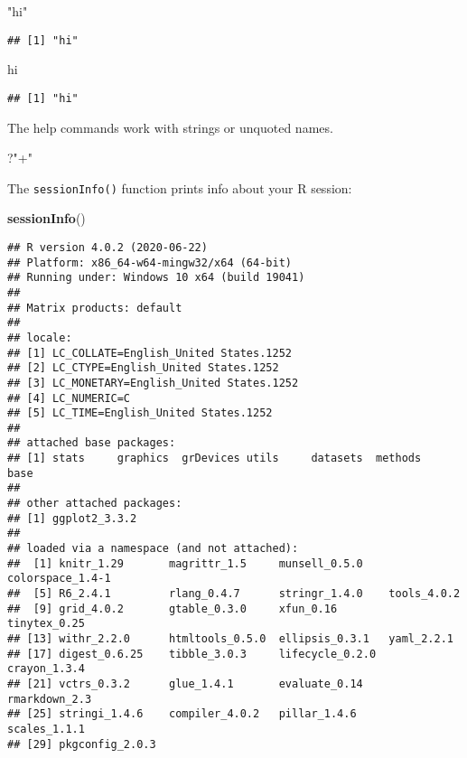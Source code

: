 \documentclass[
]{article}
\newenvironment{Shaded}{\begin{snugshade}}{\end{snugshade}}
\newcommand{\KeywordTok}[1]{\textcolor[rgb]{0.13,0.29,0.53}{\textbf{#1}}}
\newcommand{\NormalTok}[1]{#1}
\newcommand{\StringTok}[1]{\textcolor[rgb]{0.31,0.60,0.02}{#1}}
\begin{document}
\begin{Shaded}
\begin{Highlighting}[]
\StringTok{"hi"}
\end{Highlighting}
\end{Shaded}

\begin{verbatim}
## [1] "hi"
\end{verbatim}

\begin{Shaded}
\begin{Highlighting}[]
\StringTok{\textquotesingle{}hi\textquotesingle{}}
\end{Highlighting}
\end{Shaded}

\begin{verbatim}
## [1] "hi"
\end{verbatim}

The help commands work with strings or unquoted names.

\begin{Shaded}
\begin{Highlighting}[]
\NormalTok{?}\StringTok{"+"}
\end{Highlighting}
\end{Shaded}

The \texttt{sessionInfo()} function prints info about your R session:

\begin{Shaded}
\begin{Highlighting}[]
\KeywordTok{sessionInfo}\NormalTok{()}
\end{Highlighting}
\end{Shaded}

\begin{verbatim}
## R version 4.0.2 (2020-06-22)
## Platform: x86_64-w64-mingw32/x64 (64-bit)
## Running under: Windows 10 x64 (build 19041)
## 
## Matrix products: default
## 
## locale:
## [1] LC_COLLATE=English_United States.1252 
## [2] LC_CTYPE=English_United States.1252   
## [3] LC_MONETARY=English_United States.1252
## [4] LC_NUMERIC=C                          
## [5] LC_TIME=English_United States.1252    
## 
## attached base packages:
## [1] stats     graphics  grDevices utils     datasets  methods   base     
## 
## other attached packages:
## [1] ggplot2_3.3.2
## 
## loaded via a namespace (and not attached):
##  [1] knitr_1.29       magrittr_1.5     munsell_0.5.0    colorspace_1.4-1
##  [5] R6_2.4.1         rlang_0.4.7      stringr_1.4.0    tools_4.0.2     
##  [9] grid_4.0.2       gtable_0.3.0     xfun_0.16        tinytex_0.25    
## [13] withr_2.2.0      htmltools_0.5.0  ellipsis_0.3.1   yaml_2.2.1      
## [17] digest_0.6.25    tibble_3.0.3     lifecycle_0.2.0  crayon_1.3.4    
## [21] vctrs_0.3.2      glue_1.4.1       evaluate_0.14    rmarkdown_2.3   
## [25] stringi_1.4.6    compiler_4.0.2   pillar_1.4.6     scales_1.1.1    
## [29] pkgconfig_2.0.3
\end{verbatim}
\end{document}
